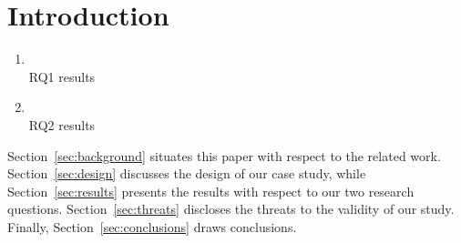\section{Introduction}


\begin{enumerate}[{\bf (RQ1)}]
\item {\bf \rqi}\\
RQ1 results

\item {\bf \rqii}\\
RQ2 results

\end{enumerate}

Section~\ref{sec:background} situates this paper with respect to the related work.
Section~\ref{sec:design} discusses the design of our case study, while Section~\ref{sec:results} presents the results with respect to our two research questions.
Section~\ref{sec:threats} discloses the threats to the validity of our study.
Finally, Section~\ref{sec:conclusions} draws conclusions.
